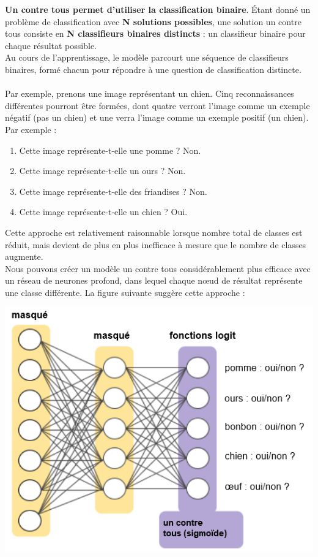 \documentclass[french]{article}
\begin{document}
\textbf{Un contre tous permet d'utiliser la classification binaire}. Étant donné un problème de classification avec \textbf{N solutions possibles}, une solution un contre tous consiste en \textbf{N classifieurs binaires distincts} : un classifieur binaire pour chaque résultat possible. \\
Au cours de l'apprentissage, le modèle parcourt une séquence de classifieurs binaires, formé chacun pour répondre à une question de classification distincte.\\\\ Par exemple, prenons une image représentant un chien. Cinq reconnaissances différentes pourront être formées, dont quatre verront l'image comme un exemple négatif (pas un chien) et une verra l'image comme un exemple positif (un chien). Par exemple :
\begin{enumerate}
	\item Cette image représente-t-elle une pomme ? Non.
	\item Cette image représente-t-elle un ours ? Non.
	\item Cette image représente-t-elle des friandises ? Non.
	\item Cette image représente-t-elle un chien ? Oui.\\
\end{enumerate}
Cette approche est relativement raisonnable lorsque nombre total de classes est réduit, mais devient de plus en plus inefficace à mesure que le nombre de classes augmente.\\
\newpage
Nous pouvons créer un modèle un contre tous considérablement plus efficace avec un réseau de neurones profond, dans lequel chaque nœud de résultat représente une classe différente. La figure suivante suggère cette approche :
\begin{center}
	\includegraphics{./Capture_1.png} 
\end{center}
\end{document}
